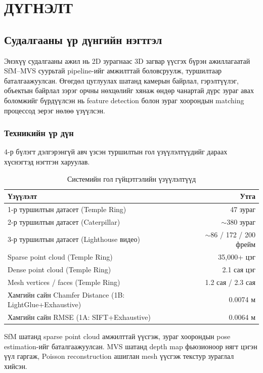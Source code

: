 \chapter{ДҮГНЭЛТ}

\section{Судалгааны үр дүнгийн нэгтгэл}

Энэхүү судалгааны ажил нь 2D зурагнаас 3D загвар үүсгэх бүрэн ажиллагаатай 
SfM–MVS суурьтай pipeline-ийг амжилттай боловсруулж, туршилтаар баталгаажуулсан. 
Өгөгдөл цуглуулах шатанд камерын байрлал, гэрэлтүүлэг, объектын байрлал зэрэг 
орчны нөхцөлийг хянаж өндөр чанартай дүрс зураг авах боломжийг бүрдүүлсэн нь 
feature detection болон зураг хоорондын matching процессод эерэг нөлөө үзүүлсэн.

\subsection{Техникийн үр дүн}

4-р бүлэгт дэлгэрэнгүй авч үзсэн туршилтын гол үзүүлэлтүүдийг дараах хүснэгтэд нэгтгэн харуулав.

\begin{table}[H]
\centering
\caption{Системийн гол гүйцэтгэлийн үзүүлэлтүүд}
\begin{tabular}{|l|r|}
\hline
\textbf{Үзүүлэлт} & \textbf{Утга} \\
\hline
1-р туршилтын датасет (Temple Ring) & 47 зураг \\
2-р туршилтын датасет (Caterpillar) & ${\sim}$380 зураг \\
3-р туршилтын датасет (Lighthouse видео) & ${\sim}$86 / 172 / 200 фрейм \\
Sparse point cloud (Temple Ring) & 35{,}000+ цэг \\
Dense point cloud (Temple Ring) & 2.1 сая цэг \\
Mesh vertices / faces (Temple Ring) & 1.2 сая / 2.3 сая \\
Хамгийн сайн Chamfer Distance (1B: LightGlue+Exhaustive) & 0.0074 м \\
Хамгийн сайн RMSE (1A: SIFT+Exhaustive) & 0.0064 м \\
\hline
\end{tabular}
\label{tab:key_results}
\end{table}

SfM шатанд sparse point cloud амжилттай үүсгэж, зураг хоорондын pose estimation-ийг баталгаажуулсан. MVS шатанд depth map фьюзионоор нягт цэгэн үүл гаргаж, Poisson reconstruction ашиглан mesh үүсгэж текстур зураглал хийсэн.

